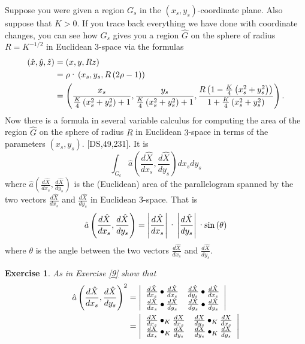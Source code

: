 \documentclass{article}%
\newtheorem{exercise}[theorem]{Exercise}
\begin{document}
Suppose you were given a region $G_{s}$ in the $\left(  x_{s},y_{s}\right)
$-coordinate plane. Also suppose that $K>0$. If you trace back everything we
have done with coordinate changes, you can see how $G_{s}$ gives you a region
$\hat{G}$ on the sphere of radius $R=K^{-1/2}$ in Euclidean $3$-space via the
formulas%
\begin{align*}
\left(  \hat{x},\hat{y},\hat{z}\right)   &  =\left(  x,y,Rz\right) \\
&  =\rho\text{\textperiodcentered}\left(  x_{s},y_{s},R\left(  2\rho-1\right)
\right) \\
&  =\left(  \frac{x_{s}}{\frac{K}{4}\left(  x_{s}^{2}+y_{s}^{2}\right)
+1},\frac{y_{s}}{\frac{K}{4}\left(  x_{s}^{2}+y_{s}^{2}\right)  +1}%
,\frac{R\left(  1-\frac{K}{4}\left(  x_{s}^{2}+y_{s}^{2}\right)  \right)
}{1+\frac{K}{4}\left(  x_{s}^{2}+y_{s}^{2}\right)  }\right)  .
\end{align*}
Now there is a formula in several variable calculus for computing the area of
the region $\hat{G}$ on the sphere of radius $R$ in Euclidean $3$-space in
terms of the parameters $\left(  x_{s},y_{s}\right)  $. [DS,49,231]. It is
\[%
{\displaystyle\int\nolimits_{G_{c}}}
\hat{a}\left(  \frac{d\hat{X}}{dx_{s}},\frac{d\hat{X}}{dy_{s}}\right)
dx_{s}dy_{s}%
\]
where $\hat{a}\left(  \frac{d\hat{X}}{dx_{s}},\frac{d\hat{X}}{dy_{s}}\right)
$ is the (Euclidean) area of the parallelogram spanned by the two vectors
$\frac{d\hat{X}}{dx_{s}}$ and $\frac{d\hat{X}}{dy_{s}}$ in Euclidean
$3$-space. That is%
\[
\hat{a}\left(  \frac{d\hat{X}}{dx_{s}},\frac{d\hat{X}}{dy_{s}}\right)
=\left\vert \frac{d\hat{X}}{dx_{s}}\right\vert \text{\textperiodcentered
}\left\vert \frac{d\hat{X}}{dy_{s}}\right\vert \text{\textperiodcentered
}\mathrm{sin}\left(  \theta\right)
\]
where $\theta$ is the angle between the two vectors $\frac{d\hat{X}}{dx_{s}}$
and $\frac{d\hat{X}}{dy_{s}}$.

\begin{exercise}
As in Exercise \ref{9} show that%
\begin{align*}
\hat{a}\left(  \frac{d\hat{X}}{dx_{s}},\frac{d\hat{X}}{dy_{s}}\right)  ^{2}
&  =\left\vert
\begin{array}
[c]{cc}%
\frac{d\hat{X}}{dx_{s}}\bullet\frac{d\hat{X}}{dx_{s}} & \frac{d\hat{X}}%
{dy_{s}}\bullet\frac{d\hat{X}}{dx_{s}}\\
\frac{d\hat{X}}{dx_{s}}\bullet\frac{d\hat{X}}{dy_{s}} & \frac{d\hat{X}}%
{dy_{s}}\bullet\frac{d\hat{X}}{dy_{s}}%
\end{array}
\right\vert \\
&  =\left\vert
\begin{array}
[c]{cc}%
\frac{dX}{dx_{s}}\bullet_{K}\frac{dX}{dx_{s}} & \frac{dX}{dy_{s}}\bullet
_{K}\frac{dX}{dx_{s}}\\
\frac{dX}{dx_{s}}\bullet_{K}\frac{dX}{dy_{s}} & \frac{dX}{dy_{s}}\bullet
_{K}\frac{dX}{dy_{s}}%
\end{array}
\right\vert
\end{align*}

\end{exercise}
\end{document}
